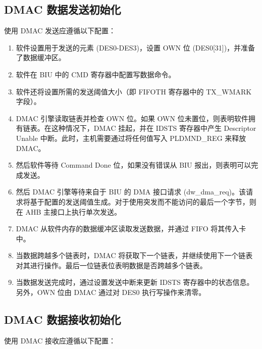 \documentclass[main\_\_CN.tex]{subfiles}
\begin{document}
\subsection{DMAC 数据发送初始化}
使用 DMAC 发送应遵循以下配置：
\begin{enumerate}
\item 软件设置用于发送的元素 (DES0-DES3)，设置 OWN 位 (DES0[31])，并准备了数据缓冲区。
\item 软件在 BIU 中的 CMD 寄存器中配置写数据命令。
\item 软件还将设置所需的发送阈值大小（即 FIFOTH 寄存器中的 TX\_WMARK 字段）。
\item DMAC 引擎读取链表并检查 OWN 位。如果 OWN 位未置位，则表明软件拥有链表。在这种情况下，DMAC 挂起，并在 IDSTS 寄存器中产生 Descriptor Unable 中断。此时，主机需要通过将任何值写入 PLDMND\_REG 来释放 DMAC。
\item 然后软件等待 Command Done 位，如果没有错误从 BIU 报出，则表明可以完成发送。
\item 然后 DMAC 引擎等待来自于 BIU 的 DMA 接口请求 (dw\_dma\_req)。该请求将基于配置的发送阈值生成。对于使用突发而不能访问的最后一个字节，则在 AHB 主接口上执行单次发送。
\item DMAC 从软件内存的数据缓冲区读取发送数据，并通过 FIFO 将其传入卡中。
\item 当数据跨越多个链表时，DMAC 将获取下一个链表，并继续使用下一个链表对其进行操作。最后一位链表位表明数据是否跨越多个链表。
\item 当数据发送完成时，通过设置发送中断来更新 IDSTS 寄存器中的状态信息。另外，OWN 位由 DMAC 通过对 DES0 执行写操作来清零。
\end{enumerate}

\subsection{DMAC 数据接收初始化}
使用 DMAC 接收应遵循以下配置：
\end{document}
